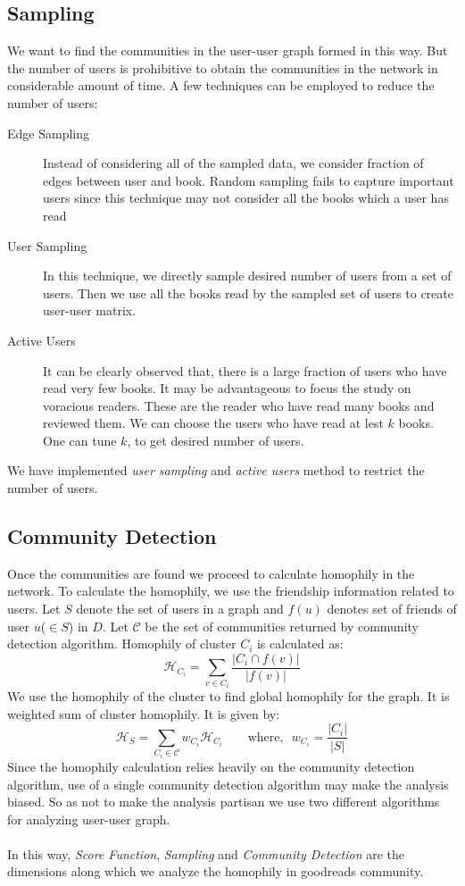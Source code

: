 \documentclass[11pt]{article}
\begin{document}
\subsection{Sampling}
We want to find the communities in the user-user graph formed in this way. But the number of users is prohibitive to obtain the communities in the network in considerable amount of time. A few techniques can be employed to reduce the number of users:
\begin{description}
	\item[Edge Sampling] Instead of considering all of the sampled data, we consider fraction of edges between user and book. Random sampling fails to capture important users since this technique may not consider all the books which a user has read
    \item[User Sampling] In this technique, we directly sample desired number of users from a set of users. Then we use all the books read by the sampled set of users to create user-user matrix.
    \item[Active Users] It can be clearly observed that, there is a large fraction of users who have read very few books. It may be advantageous to focus the study on voracious readers. These are the reader who have read many books and reviewed them. We can choose the users who have read at lest $k$ books. One can tune $k$, to get desired number of users.
\end{description}
We have implemented {\it user sampling} and {\it active users} method to restrict the number of users.

\subsection{Community Detection}
Once the communities are found we proceed to calculate homophily in the network. To calculate the homophily, we use the friendship information related to users. Let $S$ denote the set of users in a graph and $f(u)$ denotes set of friends of user $u$($\in S$) in $D$. Let $\mathcal{C}$ be the set of communities returned by community detection algorithm. Homophily of cluster $C_i$ is calculated as:
\[
\mathcal{H}_{C_i} = \sum_{v \in C_i} \frac{|C_i \cap f(v)|}{|f(v)|}
\]
We use the homophily of the cluster to find global homophily for the graph. It is weighted sum of cluster homophily. It is given by:
\[
\mathcal{H}_{S} = \sum_{C_i \in \mathcal{C}} w_{C_i} \mathcal{H}_{C_i} ~~~~~~~~~\textrm{where,}~~~w_{C_i} = \frac{|C_i|}{|S|}
\]
Since the homophily calculation relies heavily on the community detection algorithm, use of a single community detection algorithm may make the analysis biased. So as not to make the analysis partisan we use two different algorithms for analyzing user-user graph.\\\\
In this way, {\it Score Function}, {\it Sampling} and {\it Community Detection} are the dimensions along which we analyze the homophily in goodreads community.
\end{document}
